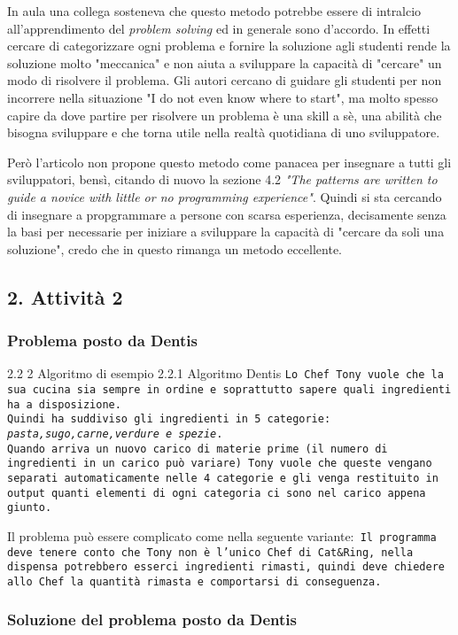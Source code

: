 \documentclass[a4paper]{article}
\begin{document}
In aula una collega sosteneva che questo metodo potrebbe essere di intralcio all'apprendimento del \textit{problem solving} ed in generale sono d'accordo.
In effetti cercare di categorizzare ogni problema e fornire la soluzione agli studenti rende la soluzione molto "meccanica" e non aiuta a sviluppare la capacità di "cercare" un modo di risolvere il problema.
Gli autori cercano di guidare gli studenti per non incorrere nella situazione "I do not even know where to start", ma molto spesso capire da dove partire per risolvere un problema è una skill a sè, una abilità che bisogna sviluppare e che torna utile nella realtà quotidiana di uno sviluppatore.


Però l'articolo non propone questo metodo come panacea per insegnare a tutti gli sviluppatori, bensì, citando di nuovo la sezione 4.2 \textit{"The patterns are written to guide a novice with little or no programming experience"}.
Quindi si sta cercando di insegnare a propgrammare a persone con scarsa esperienza, decisamente senza la basi per necessarie per iniziare a sviluppare la capacità di "cercare da soli una soluzione", credo che in questo rimanga un metodo eccellente.
\subsection{2. Attività 2}
\subsubsection{Problema posto da Dentis}
2.2 2 Algoritmo di esempio 2.2.1 Algoritmo Dentis
\texttt{Lo Chef Tony vuole che la sua cucina sia sempre in ordine e soprattutto sapere quali ingredienti ha a disposizione.\\Quindi ha suddiviso gli ingredienti in 5 categorie: \textit{pasta,sugo,carne,verdure e spezie}.\\ Quando arriva un nuovo carico di materie prime (il numero di ingredienti in un carico può variare) Tony vuole che queste vengano separati automaticamente nelle 4 categorie e gli venga restituito in output quanti elementi di ogni categoria ci sono nel carico appena giunto.}

Il problema può essere complicato come nella seguente variante:\texttt{ Il programma deve tenere conto che Tony non è l'unico Chef di Cat\&Ring, nella dispensa potrebbero esserci ingredienti rimasti, quindi deve chiedere allo Chef la quantità rimasta e comportarsi di conseguenza.}
\subsubsection{Soluzione del problema posto da Dentis}
\end{document}
